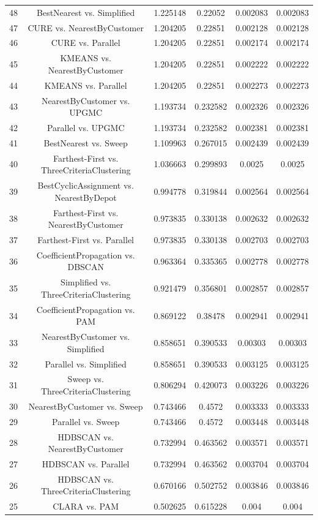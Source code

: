 \documentclass[a4paper,10pt]{article}
\begin{document}
\begin{landscape}
\begin{table}[!htp]
\begin{tabular}{cccccc}
48&BestNearest vs. Simplified&1.225148&0.22052&0.002083&0.002083\\
47&CURE vs. NearestByCustomer&1.204205&0.22851&0.002128&0.002128\\
46&CURE vs. Parallel&1.204205&0.22851&0.002174&0.002174\\
45&KMEANS vs. NearestByCustomer&1.204205&0.22851&0.002222&0.002222\\
44&KMEANS vs. Parallel&1.204205&0.22851&0.002273&0.002273\\
43&NearestByCustomer vs. UPGMC&1.193734&0.232582&0.002326&0.002326\\
42&Parallel vs. UPGMC&1.193734&0.232582&0.002381&0.002381\\
41&BestNearest vs. Sweep&1.109963&0.267015&0.002439&0.002439\\
40&Farthest-First vs. ThreeCriteriaClustering&1.036663&0.299893&0.0025&0.0025\\
39&BestCyclicAssignment vs. NearestByDepot&0.994778&0.319844&0.002564&0.002564\\
38&Farthest-First vs. NearestByCustomer&0.973835&0.330138&0.002632&0.002632\\
37&Farthest-First vs. Parallel&0.973835&0.330138&0.002703&0.002703\\
36&CoefficientPropagation vs. DBSCAN&0.963364&0.335365&0.002778&0.002778\\
35&Simplified vs. ThreeCriteriaClustering&0.921479&0.356801&0.002857&0.002857\\
34&CoefficientPropagation vs. PAM&0.869122&0.38478&0.002941&0.002941\\
33&NearestByCustomer vs. Simplified&0.858651&0.390533&0.00303&0.00303\\
32&Parallel vs. Simplified&0.858651&0.390533&0.003125&0.003125\\
31&Sweep vs. ThreeCriteriaClustering&0.806294&0.420073&0.003226&0.003226\\
30&NearestByCustomer vs. Sweep&0.743466&0.4572&0.003333&0.003333\\
29&Parallel vs. Sweep&0.743466&0.4572&0.003448&0.003448\\
28&HDBSCAN vs. NearestByCustomer&0.732994&0.463562&0.003571&0.003571\\
27&HDBSCAN vs. Parallel&0.732994&0.463562&0.003704&0.003704\\
26&HDBSCAN vs. ThreeCriteriaClustering&0.670166&0.502752&0.003846&0.003846\\
25&CLARA vs. PAM&0.502625&0.615228&0.004&0.004\\

\end{tabular}
\end{table}
\end{landscape}
\end{document}
